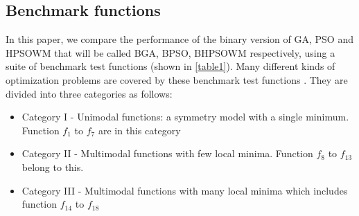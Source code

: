 \subsection{Benchmark functions}
In this paper, we compare the performance of the binary version of GA, PSO and HPSOWM that will be called BGA, BPSO, BHPSOWM respectively, using a suite of benchmark test functions (shown in \ref{table1}). Many different kinds of optimization problems are covered by these benchmark test functions \cite{ling2008hybrid}. They are divided into three categories as follows:
\begin{itemize}
	\item Category I - Unimodal functions: a symmetry model with a single minimum. Function $f_1$ to $f_7$ are in this category
	\item Category II - Multimodal functions with few local minima. Function $f_8$ to $f_{13}$ belong to this.
	\item Category III - Multimodal functions with many local minima which includes function $f_{14}$ to $f_{18}$
\end{itemize}



